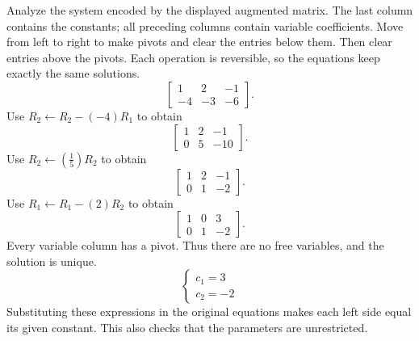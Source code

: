\goal Analyze the system encoded by the displayed augmented matrix. The last column contains the constants; all preceding columns contain variable coefficients.
\idea Move from left to right to make pivots and clear the entries below them. Then clear entries above the pivots. Each operation is reversible, so the equations keep exactly the same solutions.
\[ \left[\begin{array}{rr|r}1&2&-1\\-4&-3&-6\end{array}\right].\]
Use $R_{2}\leftarrow R_{2}-(-4)R_{1}$ to obtain
\[ \left[\begin{array}{rr|r}1&2&-1\\0&5&-10\end{array}\right].\]
Use $R_{2}\leftarrow(\frac{1}{5})R_{2}$ to obtain
\[ \left[\begin{array}{rr|r}1&2&-1\\0&1&-2\end{array}\right].\]
Use $R_{1}\leftarrow R_{1}-(2)R_{2}$ to obtain
\[ \left[\begin{array}{rr|r}1&0&3\\0&1&-2\end{array}\right].\]
Every variable column has a pivot. Thus there are no free variables, and the solution is unique.
\[ \begin{cases}c_{1}=3\\c_{2}=-2\end{cases}\]
Substituting these expressions in the original equations makes each left side equal its given constant. This also checks that the parameters are unrestricted.

